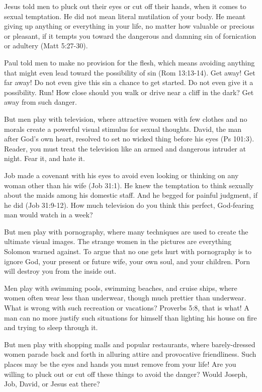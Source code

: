 Jesus told men to pluck out their eyes or cut off their hands, when it comes to sexual temptation. He did not mean literal mutilation of your body. He meant giving up anything or everything in your life, no matter how valuable or precious or pleasant, if it tempts you toward the dangerous and damning sin of fornication or adultery (Matt 5:27-30).

Paul told men to make no provision for the flesh, which means avoiding anything that might even lead toward the possibility of sin (Rom 13:13-14). Get away! Get far away! Do not even give this sin a chance to get started. Do not even give it a possibility. Run! How close should you walk or drive near a cliff in the dark? Get away from such danger.

But men play with television, where attractive women with few clothes and no morals create a powerful visual stimulus for sexual thoughts. David, the man after God’s own heart, resolved to set no wicked thing before his eyes (Ps 101:3). Reader, you must treat the television like an armed and dangerous intruder at night. Fear it, and hate it.

Job made a covenant with his eyes to avoid even looking or thinking on any woman other than his wife (Job 31:1). He knew the temptation to think sexually about the maids among his domestic staff. And he begged for painful judgment, if he did (Job 31:9-12). How much television do you think this perfect, God-fearing man would watch in a week?

But men play with pornography, where many techniques are used to create the ultimate visual images. The strange women in the pictures are everything Solomon warned against. To argue that no one gets hurt with pornography is to ignore God, your present or future wife, your own soul, and your children. Porn will destroy you from the inside out.

Men play with swimming pools, swimming beaches, and cruise ships, where women often wear less than underwear, though much prettier than underwear. What is wrong with such recreation or vacations? Proverbs 5:8, that is what! A man can no more justify such situations for himself than lighting his house on fire and trying to sleep through it.

But men play with shopping malls and popular restaurants, where barely-dressed women parade back and forth in alluring attire and provocative friendliness. Such places may be the eyes and hands you must remove from your life! Are you willing to pluck out or cut off these things to avoid the danger? Would Joseph, Job, David, or Jesus eat there?

